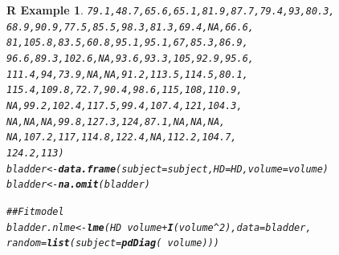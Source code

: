 \documentclass{article}\usepackage[]{graphicx}\usepackage[]{color}
\makeatletter
\newcommand{\hlnum}[1]{\textcolor[rgb]{0.686,0.059,0.569}{#1}}%
\newcommand{\hlcom}[1]{\textcolor[rgb]{0.678,0.584,0.686}{\textit{#1}}}%
\newcommand{\hlopt}[1]{\textcolor[rgb]{0,0,0}{#1}}%
\newcommand{\hlstd}[1]{\textcolor[rgb]{0.345,0.345,0.345}{#1}}%
\newcommand{\hlkwb}[1]{\textcolor[rgb]{0.69,0.353,0.396}{#1}}%
\newcommand{\hlkwc}[1]{\textcolor[rgb]{0.333,0.667,0.333}{#1}}%
\newcommand{\hlkwd}[1]{\textcolor[rgb]{0.737,0.353,0.396}{\textbf{#1}}}%
\newenvironment{kframe}{%
 \def\at@end@of@kframe{}%
 \ifinner\ifhmode%
  \def\at@end@of@kframe{\end{minipage}}%
  \begin{minipage}{\columnwidth}%
 \fi\fi%
 \def\FrameCommand##1{\hskip\@totalleftmargin \hskip-\fboxsep
 \colorbox{shadecolor}{##1}\hskip-\fboxsep
     \hskip-\linewidth \hskip-\@totalleftmargin \hskip\columnwidth}%
 \MakeFramed {\advance\hsize-\width
   \@totalleftmargin\z@ \linewidth\hsize
   \@setminipage}}%
 {\par\unskip\endMakeFramed%
 \at@end@of@kframe}
\newenvironment{knitrout}{}{} %
\newtheorem{rexample}{R Example}%
\makeatother
\begin{document}
\begin{knitrout}
\begin{kframe}
\begin{rexample}
\begin{alltt}
    \hlnum{79.1}\hlstd{,} \hlnum{48.7}\hlstd{,} \hlnum{65.6}\hlstd{,} \hlnum{65.1}\hlstd{,} \hlnum{81.9}\hlstd{,} \hlnum{87.7}\hlstd{,} \hlnum{79.4}\hlstd{,} \hlnum{93}\hlstd{,} \hlnum{80.3}\hlstd{,}
    \hlnum{68.9}\hlstd{,} \hlnum{90.9}\hlstd{,} \hlnum{77.5}\hlstd{,} \hlnum{85.5}\hlstd{,} \hlnum{98.3}\hlstd{,} \hlnum{81.3}\hlstd{,} \hlnum{69.4}\hlstd{,} \hlnum{NA}\hlstd{,} \hlnum{66.6}\hlstd{,}
    \hlnum{81}\hlstd{,} \hlnum{105.8}\hlstd{,} \hlnum{83.5}\hlstd{,} \hlnum{60.8}\hlstd{,} \hlnum{95.1}\hlstd{,} \hlnum{95.1}\hlstd{,} \hlnum{67}\hlstd{,} \hlnum{85.3}\hlstd{,} \hlnum{86.9}\hlstd{,}
    \hlnum{96.6}\hlstd{,} \hlnum{89.3}\hlstd{,} \hlnum{102.6}\hlstd{,} \hlnum{NA}\hlstd{,} \hlnum{93.6}\hlstd{,} \hlnum{93.3}\hlstd{,} \hlnum{105}\hlstd{,} \hlnum{92.9}\hlstd{,} \hlnum{95.6}\hlstd{,}
    \hlnum{111.4}\hlstd{,} \hlnum{94}\hlstd{,} \hlnum{73.9}\hlstd{,} \hlnum{NA}\hlstd{,} \hlnum{NA}\hlstd{,} \hlnum{91.2}\hlstd{,} \hlnum{113.5}\hlstd{,} \hlnum{114.5}\hlstd{,} \hlnum{80.1}\hlstd{,}
    \hlnum{115.4}\hlstd{,} \hlnum{109.8}\hlstd{,} \hlnum{72.7}\hlstd{,} \hlnum{90.4}\hlstd{,} \hlnum{98.6}\hlstd{,} \hlnum{115}\hlstd{,} \hlnum{108}\hlstd{,} \hlnum{110.9}\hlstd{,}
    \hlnum{NA}\hlstd{,} \hlnum{99.2}\hlstd{,} \hlnum{102.4}\hlstd{,} \hlnum{117.5}\hlstd{,} \hlnum{99.4}\hlstd{,} \hlnum{107.4}\hlstd{,} \hlnum{121}\hlstd{,} \hlnum{104.3}\hlstd{,}
    \hlnum{NA}\hlstd{,} \hlnum{NA}\hlstd{,} \hlnum{NA}\hlstd{,} \hlnum{99.8}\hlstd{,} \hlnum{127.3}\hlstd{,} \hlnum{124}\hlstd{,} \hlnum{87.1}\hlstd{,} \hlnum{NA}\hlstd{,} \hlnum{NA}\hlstd{,} \hlnum{NA}\hlstd{,}
    \hlnum{NA}\hlstd{,} \hlnum{107.2}\hlstd{,} \hlnum{117}\hlstd{,} \hlnum{114.8}\hlstd{,} \hlnum{122.4}\hlstd{,} \hlnum{NA}\hlstd{,} \hlnum{112.2}\hlstd{,} \hlnum{104.7}\hlstd{,}
    \hlnum{124.2}\hlstd{,} \hlnum{113}\hlstd{)}
\hlstd{bladder} \hlkwb{<-} \hlkwd{data.frame}\hlstd{(}\hlkwc{subject} \hlstd{= subject,} \hlkwc{HD} \hlstd{= HD,} \hlkwc{volume} \hlstd{= volume)}
\hlstd{bladder} \hlkwb{<-} \hlkwd{na.omit}\hlstd{(bladder)}

\hlcom{## Fit model}
\hlstd{bladder.nlme} \hlkwb{<-} \hlkwd{lme}\hlstd{(HD} \hlopt{~} \hlstd{volume} \hlopt{+} \hlkwd{I}\hlstd{(volume}\hlopt{^}\hlnum{2}\hlstd{),} \hlkwc{data} \hlstd{= bladder,}
    \hlkwc{random} \hlstd{=} \hlkwd{list}\hlstd{(}\hlkwc{subject} \hlstd{=} \hlkwd{pdDiag}\hlstd{(}\hlopt{~}\hlstd{volume)))}
\end{alltt}
\end{rexample}\end{kframe}
\end{knitrout}
\end{document}

